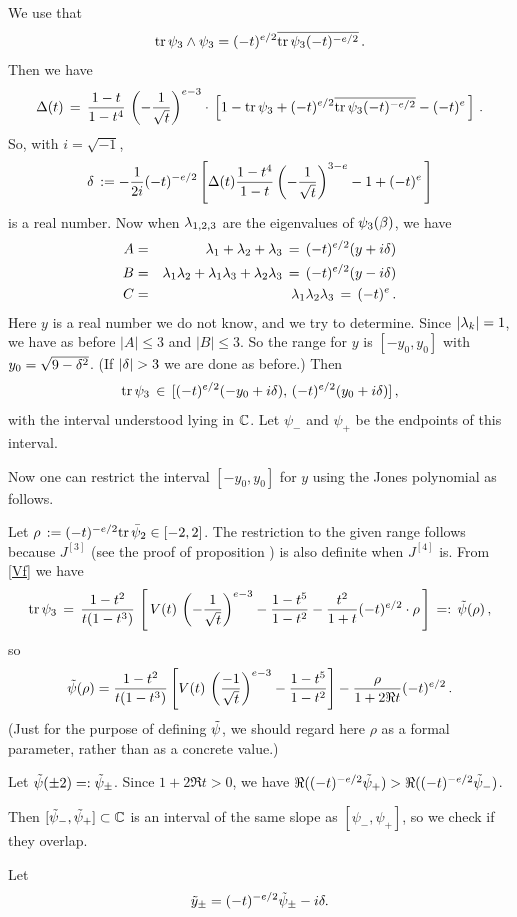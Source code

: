 We use that
\[
\text{tr\,} \psi_3\wedge \psi_3 = (-t)^{e/2}\overline{\text{tr\,} \psi_3(-t)^{-e/2}}\,.
\]
Then we have
\[
\Delta(t)\,=\,\frac{1-t}{1-t^4}\,\left(-\frac{1}{\sqrt{t}}\right)^{e-3}
\cdot\,\left[ 1-\text{tr\,} \psi_3 + (-t)^{e/2}\overline{\text{tr\,} \psi_3(-t)^{-e/2}}-
(-t)^e\,\right]\,.
\]
So, with $i=\sqrt{-1}$,
\[
\delta\,:=-\frac{1}{2i}(-t)^{-e/2}
\left[ \Delta(t)\frac{1-t^4}{1-t}\left(-\frac{1}{\sqrt{t}}\right)^{3-e}
-1 + (-t)^e\,\right]
\]
is a real number. Now when $\lambda_{1,2,3}$ are the eigenvalues of
$\psi_3(\beta)$, we have
\begin{eqnarray*}
A & = & \lambda_1+\lambda_2+\lambda_3\,=\,(-t)^{e/2}(y+i\delta) \\
B & = & \lambda_1\lambda_2+\lambda_1\lambda_3+\lambda_2\lambda_3\,=\,(-t)^{e/2}(y-i\delta) \\
C & = & \lambda_1\lambda_2\lambda_3\,=\,(-t)^e\,.
\end{eqnarray*}
Here $y$ is a real number we do not know, and we try to determine.
Since $|\lambda_k|=1$, we have
as before $|A|\le 3$ and $|B|\le 3$. So the range
for $y$ is $[-y_0,y_0]$ with $y_0=\sqrt{9-\delta^2}$.
(If $|\dl|>3$ we are done as before.) Then
\[
\text{tr\,}\psi_3\,\in\,[(-t)^{e/2}(-y_0+i\delta),\, (-t)^{e/2}(y_0+i\delta)]\,,
\]
with the interval understood lying in ${\Bbb C}$.
Let $\psi_-$ and $\psi_+$ be the endpoints of this interval.

Now one can restrict the interval $[-y_0,y_0]$ for $y$ using the
Jones polynomial as follows.

Let $\rho\,:=(-t)^{-e/2}\text{tr\,}\bar\psi_2\in [-2,2]$. The restriction
to the given range follows because $J^{[3]}$ (see the proof of
proposition ) is also definite when
$J^{[4]}$ is. From \eqref{Vf} we have
\[
\text{tr\,} \psi_3\,=\,\frac{1-t^2}{t(1-t^3)}\,\left[\,
V(t)\,\left(-\frac{1}{\sqrt{t}}\right)^{e-3}-\frac{1-t^5}{1-t^2}
-\frac{t^2}{1+t}(-t)^{e/2}\cdot \rho\,\right]\,=:\,\tilde\psi(\rho)\,,
\]
so
\[
\tilde\psi(\rho)=\frac{1-t^2}{t(1-t^3)}\left [
V(t)\,\left(\frac{-1}{\sqrt{t}}\right)^{e-3}-
\frac{1-t^5}{1-t^2}\right] -\frac{\rho}{1+2\Re t}(-t)^{e/2}\,.
\]
(Just for the purpose of defining $\tilde\psi$, we should regard here
$\rho$ as a formal parameter, rather than as a concrete value.)

Let $\tilde\psi(\pm 2)=:\tilde\psi_\pm$. Since $1+2\Re t>0$, we have
$\Re((-t)^{-e/2}\tilde\psi_+)>\Re((-t)^{-e/2}\tilde\psi_-)$.

Then $[\tilde\psi_-,\tilde\psi_+]\subset {\Bbb C}$ is an interval
of the same slope as $[\psi_-,\psi_+]$, so we check if they overlap.

Let
\[
\tilde y_{\pm}= (-t)^{-e/2}\tilde\psi_\pm -i\delta.
\]

